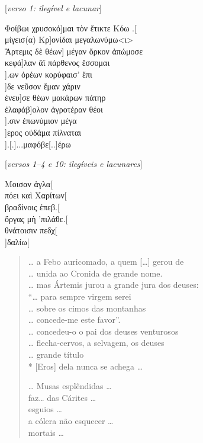 \begin{gkverse}
\textnormal{[\textit{verso 1: ilegível e lacunar}]}

Φοίβωι χρυσοκό]μαι τὸν ἔτικτε Κόω .[\\
μίγεισ(α)         Κρ]ονίδαι μεγαλωνύμω<ι>\\
Ἄρτεμις δὲ θέων] μέγαν ὄρκον ἀπώμοσε\\
    κεφά]λαν ἄϊ πάρθενος ἔσσομαι\\
             ].ων ὀρέων κορύφαισ’ ἔπι\\
    ]δε νεῦσον ἔμαν χάριν\\
         ένευ]σε θέων μακάρων πάτηρ\\
ἐλαφάβ]ολον ἀγροτέραν θέοι\\
            ].σιν ἐπωνύμιον μέγα\\
   ]ερος οὐδάμα πίλναται\\
     ].[.]...μαφόβε[..]έρω

\textnormal{[\textit{versos 1--4 e 10: ilegíveis e lacunares}]}

Μοισαν ἀγλα[\\
πόει καὶ Χαρίτων[\\
βραδίνοις ἐπεβ.[\\
ὄργας μὴ ’πιλάθε.[\\
θνάτοισιν πεδχ[\\
      ]δαλίω[
\end{gkverse}
\pagebreak
\begin{verse}
\ldots{} a Febo auricomado, a quem [\ldots{}] gerou de \\
\ldots{} unida ao Cronida de grande nome.\\
\ldots{} mas Ártemis jurou a grande jura dos deuses:\\
``\ldots{} para sempre virgem serei\\
\ldots{} sobre os cimos das montanhas\\
\ldots{} concede-me este favor''.\\
\ldots{} concedeu-o o pai dos deuses venturosos\\
\ldots{} flecha-cervos, a selvagem, os deuses\\
\ldots{} grande título\\*
[Eros] dela nunca se achega \ldots{}

\hspace*{16mm}

\ldots{} Musas esplêndidas \ldots{}\\
faz\ldots{} das Cárites \ldots{}\\
esguios \ldots{}\\
a cólera não esquecer \ldots{}\\
mortais \ldots{}
\end{verse}

